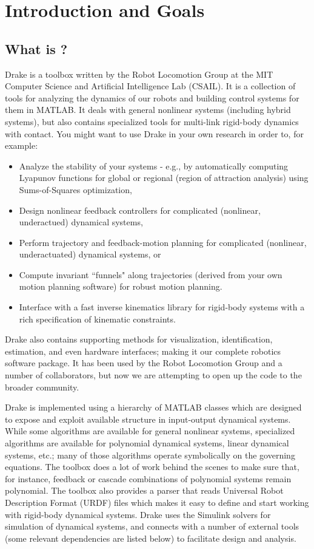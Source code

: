 \chapter{Introduction and Goals}



\section{What is \drake?}

Drake is a toolbox written by the Robot Locomotion Group at the MIT Computer Science and Artificial Intelligence Lab (CSAIL). It is a collection of tools for analyzing the dynamics of our robots and building control systems for them in MATLAB. It deals with general nonlinear systems (including hybrid systems), but also contains specialized tools for multi-link rigid-body dynamics with contact. You might want to use Drake in your own research in order to, for example:
\begin{itemize}
\item Analyze the stability of your systems - e.g., by automatically computing Lyapunov functions for global or regional (region of attraction analysis) using Sums-of-Squares optimization,
\item Design nonlinear feedback controllers for complicated (nonlinear, underactued) dynamical systems,
\item Perform trajectory and feedback-motion planning for complicated (nonlinear, underactuated) dynamical systems, or
\item Compute invariant ``funnels" along trajectories (derived from your own motion planning software) for robust motion planning. 
\item Interface with a fast inverse kinematics library for rigid-body systems with a rich specification of kinematic constraints.
\end{itemize}

Drake also contains supporting methods for visualization, identification, estimation, and even hardware interfaces; making it our complete robotics software package. It has been used by the Robot Locomotion Group and a number of collaborators, but now we are attempting to open up the code to the broader community.

Drake is implemented using a hierarchy of MATLAB classes which are designed to expose and exploit available structure in input-output dynamical systems. While some algorithms are available for general nonlinear systems, specialized algorithms are available for polynomial dynamical systems, linear dynamical systems, etc.; many of those algorithms operate symbolically on the governing equations. The toolbox does a lot of work behind the 
scenes to make sure that, for instance, feedback or cascade combinations of polynomial systems remain polynomial. The toolbox also provides a parser that reads Universal Robot Description Format (URDF) files which makes it easy to define and start working with rigid-body dynamical systems. Drake uses the Simulink solvers for simulation of dynamical systems, and connects with a number of external tools (some relevant dependencies are listed below) to facilitate design and analysis. 

